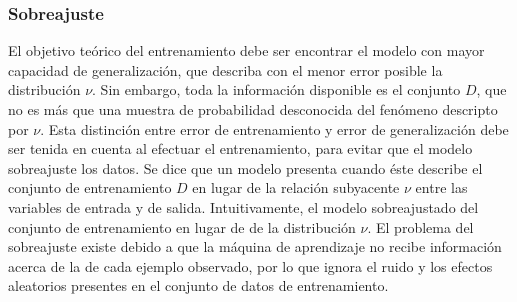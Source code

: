 %
\subsubsection{Sobreajuste}
%
El objetivo teórico del entrenamiento debe ser encontrar el modelo con
mayor capacidad de generalización, que describa con el menor error
posible la distribución $\nu$.
Sin embargo, toda la información disponible es el conjunto $D$, que no
es más que una muestra de probabilidad desconocida del fenómeno
descripto por $\nu$.
Esta distinción entre error de entrenamiento y error de generalización
debe ser tenida en cuenta al efectuar el entrenamiento, para evitar
que el modelo {sobreajuste} los datos.
Se dice que un modelo presenta  cuando éste describe el
conjunto de entrenamiento $D$ en lugar de la relación subyacente $\nu$
entre las variables de entrada y de salida.
Intuitivamente, el modelo sobreajustado  del
conjunto de entrenamiento en lugar de  de
la distribución $\nu$.
El problema del sobreajuste existe debido a que la máquina de
aprendizaje no recibe información acerca de la  de
cada ejemplo observado, por lo que ignora el ruido y los efectos
aleatorios presentes en el conjunto de datos de entrenamiento.
